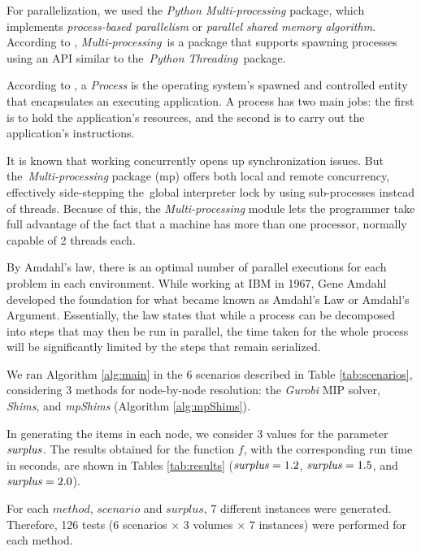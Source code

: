 \documentclass[preprint,authoryear]{elsarticle}
\begin{document}
For parallelization, we used the {\it Python Multi-processing} package, which implements {\it process-based parallelism} or {\it parallel shared memory algorithm}. According to \cite{multiprocessing}, {\it Multi-processing} is a package that supports spawning processes using an API similar to the {\it Python Threading} package.

According to \cite[p.271]{Breshears2009}, a {\it Process} is the operating system’s spawned and controlled entity that encapsulates an executing application. A process has two main jobs: the first is to hold the application's resources, and the second is to carry out the application's instructions. 

It is known that working concurrently opens up synchronization issues. But the {\it Multi-processing} package (mp) offers both local and remote concurrency, effectively side-stepping the global interpreter lock by using sub-processes instead of threads. Because of this, the {\it Multi-processing} module lets the programmer take full advantage of the fact that a machine has more than one processor, normally capable of 2 threads each.

By Amdahl's law, there is an optimal number of parallel executions for each problem in each environment. While working at IBM in 1967, Gene Amdahl developed the foundation for what became known as Amdahl's Law or Amdahl's Argument. Essentially, the law states that while a process can be decomposed into steps that may then be run in parallel, the time taken for the whole process will be significantly limited by the steps that remain serialized.

We ran Algorithm \ref{alg:main} in the 6 scenarios described in Table \ref{tab:scenarios}, considering 3 methods for node-by-node resolution: the {\it Gurobi} MIP solver, {\it Shims}, and {\it mpShims} (Algorithm \ref{alg:mpShims}).

In generating the items in each node, we consider 3 values for the parameter ${\it surplus}$. The results obtained for the function $f$, with the corresponding run time in seconds, are shown in Tables \ref{tab:results} (${\it surplus} = 1.2$, ${\it surplus} = 1.5$, and ${\it surplus} = 2.0$).

For each $method$, $scenario$ and $surplus$, 7 different instances were generated. Therefore, 126 tests (6 scenarios $\times$ 3 volumes $\times$ 7 instances) were performed for each method. 
\end{document}
